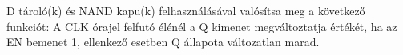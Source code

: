 \begin{example}

D tároló(k) és NAND kapu(k) felhasználásával valósítsa meg a következő funkciót:
A CLK órajel felfutó élénél a Q kimenet megváltoztatja értékét, ha az EN bemenet 1, ellenkező esetben Q állapota változatlan marad.


\tcbline
\vspace{1mm}

\solution

\end{example}